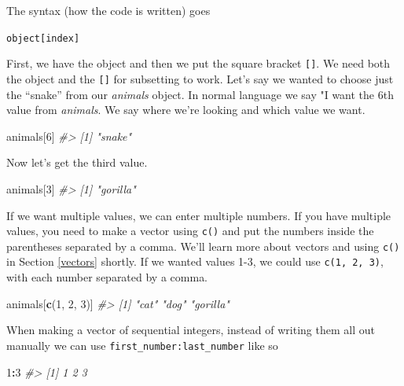 \documentclass[
  12pt,
]{book}
\newenvironment{Shaded}{\begin{snugshade}}{\end{snugshade}}
\newcommand{\CommentTok}[1]{\textcolor[rgb]{0.37,0.37,0.37}{\textit{#1}}}
\newcommand{\DecValTok}[1]{\textcolor[rgb]{0.06,0.06,0.06}{#1}}
\newcommand{\KeywordTok}[1]{\textcolor[rgb]{0.27,0.27,0.27}{\textbf{#1}}}
\newcommand{\NormalTok}[1]{#1}
\newcommand{\OperatorTok}[1]{\textcolor[rgb]{0.43,0.43,0.43}{\textbf{#1}}}
\begin{document}
The syntax (how the code is written) goes

\texttt{object{[}index{]}}

First, we have the object and then we put the square bracket \texttt{{[}{]}}. We need both the object and the \texttt{{[}{]}} for subsetting to work. Let's say we wanted to choose just the ``snake'' from our \emph{animals} object. In normal language we say "I want the 6th value from \emph{animals}. We say where we're looking and which value we want.

\begin{Shaded}
\begin{Highlighting}[]
\NormalTok{animals[}\DecValTok{6}\NormalTok{]}
\CommentTok{\#> [1] "snake"}
\end{Highlighting}
\end{Shaded}

Now let's get the third value.

\begin{Shaded}
\begin{Highlighting}[]
\NormalTok{animals[}\DecValTok{3}\NormalTok{]}
\CommentTok{\#> [1] "gorilla"}
\end{Highlighting}
\end{Shaded}

If we want multiple values, we can enter multiple numbers. If you have multiple values, you need to make a vector using \texttt{c()} and put the numbers inside the parentheses separated by a comma. We'll learn more about vectors and using \texttt{c()} in Section \ref{vectors} shortly. If we wanted values 1-3, we could use \texttt{c(1,\ 2,\ 3)}, with each number separated by a comma.

\begin{Shaded}
\begin{Highlighting}[]
\NormalTok{animals[}\KeywordTok{c}\NormalTok{(}\DecValTok{1}\NormalTok{, }\DecValTok{2}\NormalTok{, }\DecValTok{3}\NormalTok{)]}
\CommentTok{\#> [1] "cat"     "dog"     "gorilla"}
\end{Highlighting}
\end{Shaded}

When making a vector of sequential integers, instead of writing them all out manually we can use \texttt{first\_number:last\_number} like so

\begin{Shaded}
\begin{Highlighting}[]
\DecValTok{1}\OperatorTok{:}\DecValTok{3}
\CommentTok{\#> [1] 1 2 3}
\end{Highlighting}
\end{Shaded}
\end{document}
